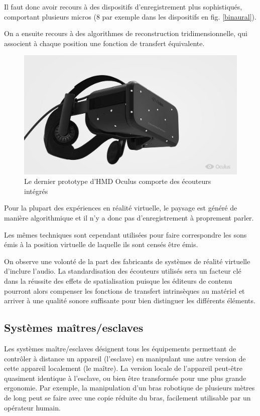 \documentclass[a4,12pt]{scrartcl}
\begin{document}
Il faut donc avoir recours à des dispositifs d'enregistrement plus sophistiqués, comportant plusieurs micros (8 par exemple dans les dispositifs en fig. \ref{binaural}).

On a ensuite recours à des algorithmes de reconstruction tridimensionnelle, qui associent à chaque position une fonction de transfert équivalente.

\begin{figure}[!h]
	\centering
	\includegraphics[width=0.6\linewidth]{crescent-bay}
	\caption{Le dernier prototype d'HMD Oculus comporte des écouteurs intégrés}
	\label{crescent-bay}
\end{figure}

Pour la plupart des expériences en réalité virtuelle, le paysage est généré de manière algorithmique et il n'y a donc pas d'enregistrement à proprement parler.

Les mêmes techniques sont cependant utilisées pour faire correspondre les sons émis à la position virtuelle de laquelle ils sont censés être émis. 

On observe une volonté de la part des fabricants de systèmes de réalité virtuelle d'inclure l'audio. La standardisation des écouteurs utilisés sera un facteur clé dans la réussite des effets de spatialisation puisque les éditeurs de contenu pourront alors compenser les fonctions de transfert intrinsèques au matériel et arriver à une qualité sonore suffisante pour bien distinguer les différents éléments.

\subsection{Systèmes maîtres/esclaves}

Les systèmes maître/esclaves désignent tous les équipements permettant de contrôler à distance un appareil (l'esclave) en manipulant une autre version de cette appareil localement (le maître). La version locale de l'appareil peut-être quasiment identique à l'esclave, ou bien être transformée pour une plus grande ergonomie. Par exemple, la manipulation d'un bras robotique de plusieurs mètres de long peut se faire avec une copie réduite du bras, facilement utilisable par un opérateur humain.
\end{document}
